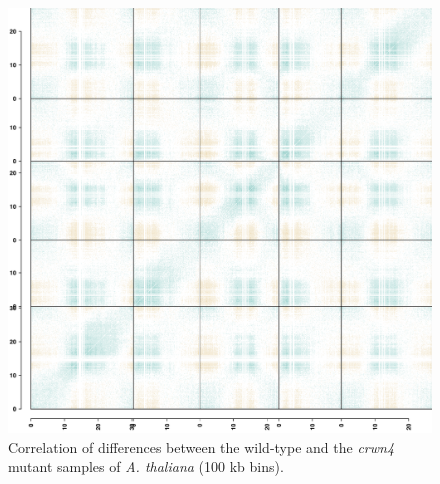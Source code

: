 \documentclass[a4paper,10pt]{article}
\begin{document}
\clearpage
\begin{figure}[!ht]
\begin{center}
\centering
\includegraphics[width=5in]{corDiff_Col_crwn4.png}
\end{center}
\caption{Correlation of differences between the wild-type and the \textit{crwn4} mutant samples of \textit{A. thaliana} \cite{2014_Grob} (100 kb bins).}
\label{corDiff}
\end{figure}
\clearpage
\end{document}

